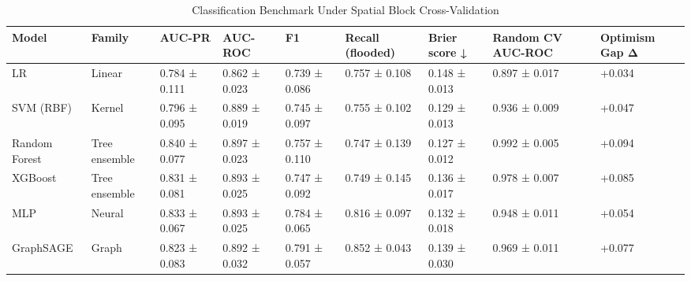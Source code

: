 \begin{table}
\caption{Classification Benchmark Under Spatial Block Cross-Validation}
\label{tab:classification}
\begin{tabular}{lllllllll}
\toprule
Model & Family & AUC-PR & AUC-ROC & F1 & Recall (flooded) & Brier score ↓ & Random CV AUC-ROC & Optimism Gap Δ \\
\midrule
LR & Linear & 0.784 ± 0.111 & 0.862 ± 0.023 & 0.739 ± 0.086 & 0.757 ± 0.108 & 0.148 ± 0.013 & 0.897 ± 0.017 & +0.034 \\
SVM (RBF) & Kernel & 0.796 ± 0.095 & 0.889 ± 0.019 & 0.745 ± 0.097 & 0.755 ± 0.102 & 0.129 ± 0.013 & 0.936 ± 0.009 & +0.047 \\
Random Forest & Tree ensemble & 0.840 ± 0.077 & 0.897 ± 0.023 & 0.757 ± 0.110 & 0.747 ± 0.139 & 0.127 ± 0.012 & 0.992 ± 0.005 & +0.094 \\
XGBoost & Tree ensemble & 0.831 ± 0.081 & 0.893 ± 0.025 & 0.747 ± 0.092 & 0.749 ± 0.145 & 0.136 ± 0.017 & 0.978 ± 0.007 & +0.085 \\
MLP & Neural & 0.833 ± 0.067 & 0.893 ± 0.025 & 0.784 ± 0.065 & 0.816 ± 0.097 & 0.132 ± 0.018 & 0.948 ± 0.011 & +0.054 \\
GraphSAGE & Graph & 0.823 ± 0.083 & 0.892 ± 0.032 & 0.791 ± 0.057 & 0.852 ± 0.043 & 0.139 ± 0.030 & 0.969 ± 0.011 & +0.077 \\
\bottomrule
\end{tabular}
\end{table}
